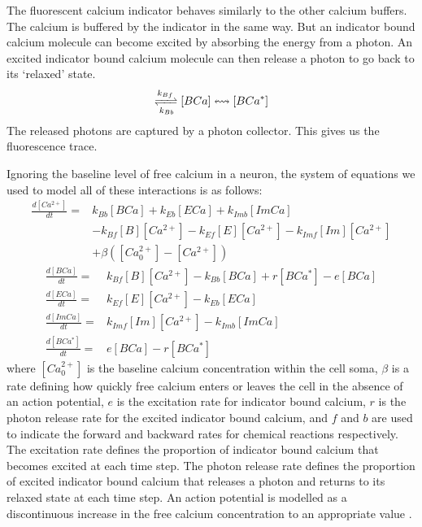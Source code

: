 \documentclass[a4paper,12pt]{article}
\theoremstyle{definition}
\newcommand{\diff}[2]{\frac{d #1}{d #2}}%
\begin{document}
The fluorescent calcium indicator behaves similarly to the other calcium buffers. The calcium is buffered by the indicator in the same way. But an indicator bound calcium molecule can become excited by absorbing the energy from a photon. An excited indicator bound calcium molecule can then release a photon to go back to its `relaxed' state.
\begin{equation*}
   [B][Ca^{2+}] \xrightleftharpoons[k_{Bb}]{k_{Bf}} [BCa] \leftrightsquigarrow [BCa^{*}]
\end{equation*}
The released photons are captured by a photon collector. This gives us the fluorescence trace.

Ignoring the baseline level of free calcium in a neuron, the system of equations we used to model all of these interactions is as follows:
\begin{equation} \label{eq:model_equations}
  \begin{split}
  \diff{[Ca^{2+}]}{t} = & k_{Bb}[BCa] + k_{Eb}[ECa] + k_{Imb}[ImCa] \\
                      & - k_{Bf}[B][Ca^{2+}]- k_{Ef} [E][Ca^{2+}] - k_{Imf}[Im][Ca^{2+}] \\
                      & + \beta ([Ca^{2+}_{0}] - [Ca^{2+}])
  \end{split}
\end{equation}
\begin{align}
  \diff{[BCa]}{t} = & k_{Bf}[B][Ca^{2+}] - k_{Bb}[BCa] + r[BCa^{*}] - e[BCa] \\
  \diff{[ECa]}{t} = & k_{Ef}[E][Ca^{2+}] - k_{Eb}[ECa] \\
  \diff{[ImCa]}{t} = & k_{Imf}[Im][Ca^{2+}] - k_{Imb}[ImCa] \\
  \diff{[BCa^{*}]}{t} = & e[BCa] - r[BCa^{*}]
\end{align}
where $[Ca^{2+}_{0}]$ is the baseline calcium concentration within the cell soma, $\beta$ is a rate defining how quickly free calcium enters or leaves the cell in the absence of an action potential, $e$ is the excitation rate for indicator bound calcium, $r$ is the photon release rate for the excited indicator bound calcium, and $f$ and $b$ are used to indicate the forward and backward rates for chemical reactions respectively. The excitation rate defines the proportion of indicator bound calcium that becomes excited at each time step. The photon release rate defines the proportion of excited indicator bound calcium that releases a photon and returns to its relaxed state at each time step. An action potential is modelled as a discontinuous increase in the free calcium concentration to an appropriate value \cite{maravall}.
\end{document}
